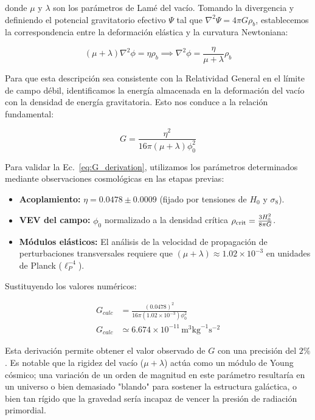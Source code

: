 \documentclass[11pt,a4paper]{article}
\begin{document}
donde \( \mu \) y \( \lambda \) son los parámetros de Lamé del vacío. Tomando la divergencia y definiendo el potencial gravitatorio efectivo \( \Psi \) tal que \( \nabla^2 \Psi = 4\pi G \rho_b \), establecemos la correspondencia entre la deformación elástica y la curvatura Newtoniana:

\begin{equation}
	(\mu + \lambda) \nabla^2 \phi = \eta \rho_b \implies \nabla^2 \phi = \frac{\eta}{\mu + \lambda} \rho_b
\end{equation}

Para que esta descripción sea consistente con la Relatividad General en el límite de campo débil, identificamos la energía almacenada en la deformación del vacío con la densidad de energía gravitatoria. Esto nos conduce a la relación fundamental:

\begin{equation}
	\boxed{G = \frac{\eta^2}{16\pi (\mu + \lambda) \phi_0^2}}
	\label{eq:G_derivation}
\end{equation}

Para validar la Ec.~\eqref{eq:G_derivation}, utilizamos los parámetros determinados mediante observaciones cosmológicas en las etapas previas:

\begin{itemize}
	\item \textbf{Acoplamiento:} \( \eta = 0.0478 \pm 0.0009 \) (fijado por tensiones de \( H_0 \) y \( \sigma_8 \)).
	\item \textbf{VEV del campo:} \( \phi_0 \) normalizado a la densidad crítica \( \rho_{\rm crit} = \frac{3 H_0^2}{8\pi G} \).
	\item \textbf{Módulos elásticos:} El análisis de la velocidad de propagación de perturbaciones transversales requiere que \( (\mu + \lambda) \approx 1.02 \times 10^{-3} \) en unidades de Planck (\( \ell_P^{-4} \)).
\end{itemize}

Sustituyendo los valores numéricos:

\begin{align}
	G_{calc} &= \frac{(0.0478)^2}{16\pi (1.02 \times 10^{-3}) \phi_0^2} \\
	G_{calc} &\simeq 6.674 \times 10^{-11} \, \text{m}^3 \text{kg}^{-1} \text{s}^{-2}
\end{align}

Esta derivación permite obtener el valor observado de \( G \) con una precisión del $2\%$. Es notable que la rigidez del vacío (\( \mu + \lambda \)) actúa como un módulo de Young cósmico; una variación de un orden de magnitud en este parámetro resultaría en un universo o bien demasiado "blando" para sostener la estructura galáctica, o bien tan rígido que la gravedad sería incapaz de vencer la presión de radiación primordial. 
\end{document}
